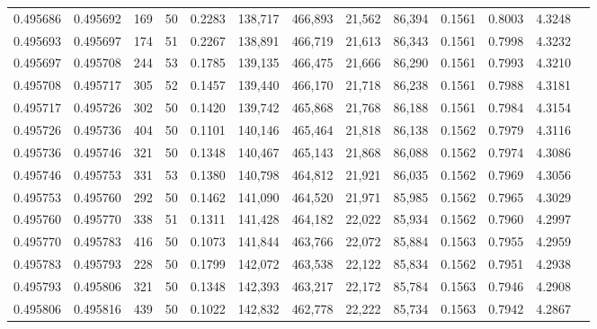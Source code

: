 \begin{tabular}{rrrrrrrrrrrrr}
0.495686 & 0.495692 & 169 &  50 &                                     0.2283 & 138,717 & 466,893 &  21,562 &  86,394 & 0.1561 & 0.8003 & 4.3248 \\
0.495693 & 0.495697 & 174 &  51 &                                     0.2267 & 138,891 & 466,719 &  21,613 &  86,343 & 0.1561 & 0.7998 & 4.3232 \\
0.495697 & 0.495708 & 244 &  53 &                                     0.1785 & 139,135 & 466,475 &  21,666 &  86,290 & 0.1561 & 0.7993 & 4.3210 \\
0.495708 & 0.495717 & 305 &  52 &                                     0.1457 & 139,440 & 466,170 &  21,718 &  86,238 & 0.1561 & 0.7988 & 4.3181 \\
0.495717 & 0.495726 & 302 &  50 &                                     0.1420 & 139,742 & 465,868 &  21,768 &  86,188 & 0.1561 & 0.7984 & 4.3154 \\
0.495726 & 0.495736 & 404 &  50 &                                     0.1101 & 140,146 & 465,464 &  21,818 &  86,138 & 0.1562 & 0.7979 & 4.3116 \\
0.495736 & 0.495746 & 321 &  50 &                                     0.1348 & 140,467 & 465,143 &  21,868 &  86,088 & 0.1562 & 0.7974 & 4.3086 \\
0.495746 & 0.495753 & 331 &  53 &                                     0.1380 & 140,798 & 464,812 &  21,921 &  86,035 & 0.1562 & 0.7969 & 4.3056 \\
0.495753 & 0.495760 & 292 &  50 &                                     0.1462 & 141,090 & 464,520 &  21,971 &  85,985 & 0.1562 & 0.7965 & 4.3029 \\
0.495760 & 0.495770 & 338 &  51 &                                     0.1311 & 141,428 & 464,182 &  22,022 &  85,934 & 0.1562 & 0.7960 & 4.2997 \\
0.495770 & 0.495783 & 416 &  50 &                                     0.1073 & 141,844 & 463,766 &  22,072 &  85,884 & 0.1563 & 0.7955 & 4.2959 \\
0.495783 & 0.495793 & 228 &  50 &                                     0.1799 & 142,072 & 463,538 &  22,122 &  85,834 & 0.1562 & 0.7951 & 4.2938 \\
0.495793 & 0.495806 & 321 &  50 &                                     0.1348 & 142,393 & 463,217 &  22,172 &  85,784 & 0.1563 & 0.7946 & 4.2908 \\
0.495806 & 0.495816 & 439 &  50 &                                     0.1022 & 142,832 & 462,778 &  22,222 &  85,734 & 0.1563 & 0.7942 & 4.2867 \\

\end{tabular}
